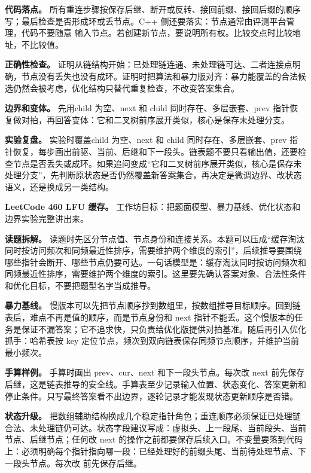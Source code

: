 \textbf{代码落点。} 所有重连步骤按保存后继、断开或反转、接回前缀、接回后缀的顺序写；最后检查是否形成环或丢节点。C++ 侧还要落实：节点通常由评测平台管理，代码不要随意  输入节点。若创建新节点，要说明所有权。比较交点时比较地址，不比较值。

\textbf{正确性检查。} 证明从链结构开始：已处理链连通、未处理链可达、二者连接点明确，节点没有丢失也没有成环。证明时把算法和暴力版对齐：暴力能覆盖的合法候选仍然会被考虑，优化结构只替代重复检查，不改变答案集合。

\textbf{边界和变体。} 先用child 为空、next 和 child 同时存在、多层嵌套、prev 指针恢复做对拍，再回答变体：它和二叉树前序展开类似，核心是保存未处理分支。

\textbf{实验复盘。} 实验时覆盖child 为空、next 和 child 同时存在、多层嵌套、prev 指针恢复，每步画出前驱、当前、后继和下一段头。链表题不要只看输出值，还要检查节点是否丢失或成环。如果追问变成“它和二叉树前序展开类似，核心是保存未处理分支”，先判断原状态是否仍然覆盖新答案集合，再决定是微调边界、改状态语义，还是换成另一类结构。

\noindent\textbf{LeetCode 460 LFU 缓存。} 工作坊目标：把题面模型、暴力基线、优化状态和边界实验完整讲出来。

\textbf{读题拆解。} 读题时先区分节点值、节点身份和连接关系。本题可以压成“缓存淘汰同时按访问频次和同频最近性排序，需要维护两个维度的索引”，后续推导要围绕哪些指针会断开、哪些节点仍要可达。一句话模型是：缓存淘汰同时按访问频次和同频最近性排序，需要维护两个维度的索引。这里要先确认答案对象、合法性条件和优化目标，不要把题型名字当成推导。

\textbf{暴力基线。} 慢版本可以先把节点顺序抄到数组里，按数组推导目标顺序。回到链表后，难点不再是值的顺序，而是节点身份和 next 指针不能丢。这个慢版本的任务是保证不漏答案；它不追求快，只负责给优化版提供对拍基准。随后再引入优化抓手：哈希表按 key 定位节点，频次到双向链表保存同频节点顺序，并维护当前最小频次。

\textbf{手算样例。} 手算时画出 prev、cur、next 和下一段头节点。每次改 next 前先保存后继，这是链表推导的安全线。手算表至少记录输入位置、状态变化、答案更新和停止条件。只写最终答案看不出边界，逐轮记录才能发现状态更新顺序是否错。

\textbf{状态升级。} 把数组辅助结构换成几个稳定指针角色；重连顺序必须保证已处理链合法、未处理链仍可达。状态字段建议写成：虚拟头、上一段尾、当前段头、当前节点、后继节点；任何改 next 的操作之前都要保存后续入口。不变量要落到代码上：必须明确每个指针指向哪一段：已经处理好的前缀头尾、当前待处理节点、下一段头节点。每次改  前先保存后继。

